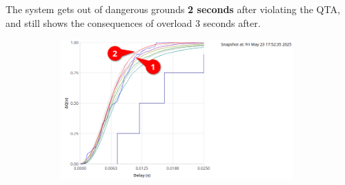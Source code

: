             The system gets out of dangerous grounds \textbf{2 seconds} after violating the QTA, and still shows the consequences of overload 3 seconds after.

        \begin{figure}[H]
            \centering
            \begin{subfigure}{.5\textwidth}
                \centering
                \includegraphics[width=0.98\textwidth]{img/return_2g1.png}
                \label{fig:appr_ov_2}
            \end{subfigure}%
        \end{figure}%
    
